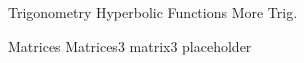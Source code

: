 Trigonometry \vtt Hyperbolic Functions \vtt More Trig. \elt
\stpar{3.0in}{
  {
  \eightrm
  
  }
} \vtt
\stpar{3.0in}{
\vskip -5.50em


} \vtt

\stpar{1.25in}{

}
\vtt \vtt \vtt
\EndTable


Matrices \vtt{} \vtt Matrices3 \elt
\stpar{3.0in}{
{\eightrm

\vskip-5.75in
} } \vtt
{} \vtt
%
matrix3
%
%
%
placeholder
%
\EndTable
